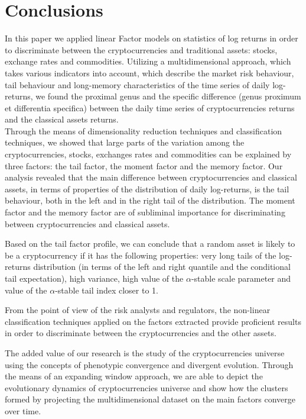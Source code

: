 \section{Conclusions}

In this paper we applied linear Factor models on statistics of log returns in order to discriminate between the cryptocurrencies and traditional assets: stocks, exchange rates and commodities. Utilizing a multidimensional approach, which takes various indicators  into account, which describe the market risk behaviour, tail behaviour and long-memory characteristics of the time series of daily log-returns, we found the proximal genus and the specific difference (genus proximum et differentia specifica) between the daily time series of cryptocurrencies returns and the classical assets returns.\\

Through the means of dimensionality reduction techniques and classification techniques, we showed that large parts of the variation among the cryptocurrencies, stocks, exchanges rates and commodities can be explained by three factors: the tail factor, the moment factor and the memory factor. Our analysis revealed that the main difference between cryptocurrencies and classical assets, in terms of properties of the distribution of daily log-returns, is the tail behaviour, both in the left and in the right tail of the distribution. The moment factor and the memory factor are of subliminal importance for discriminating between cryptocurrencies and classical assets.

Based on the tail factor profile, we can conclude that a random asset is likely to be a cryptocurrency if it has the following properties: very long tails of the log-returns distribution (in terms of the left and right quantile and the conditional tail expectation), high variance, high value of the $\alpha$-stable scale parameter and value of the $\alpha$-stable tail index closer to 1.

From the point of view of the risk analysts and regulators, the non-linear classification techniques applied on the factors extracted provide proficient results in order to discriminate between the cryptocurrencies and the other assets.

The added value of our research is the study of the cryptocurrencies universe using the concepts of phenotypic convergence and divergent evolution. Through the means of an expanding window approach, we are able to depict the evolutionary dynamics of cryptocurrencies universe and show how the clusters formed by projecting the multidimensional dataset on the main factors converge over time.

